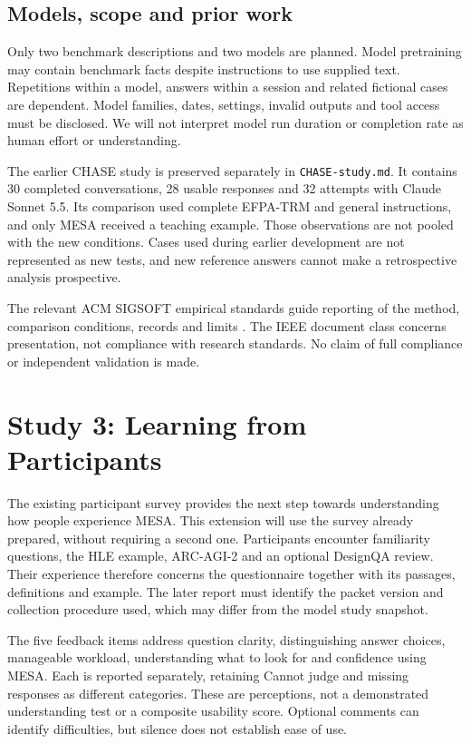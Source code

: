 \documentclass[10pt,conference]{IEEEtran}
\begin{document}
\subsection{Models, scope and prior work}
Only two benchmark descriptions and two models are planned. Model pretraining may contain benchmark facts despite instructions to use supplied text. Repetitions within a model, answers within a session and related fictional cases are dependent. Model families, dates, settings, invalid outputs and tool access must be disclosed. We will not interpret model run duration or completion rate as human effort or understanding.

The earlier CHASE study is preserved separately in \texttt{CHASE-study.md}. It contains 30 completed conversations, 28 usable responses and 32 attempts with Claude Sonnet 5.5. Its comparison used complete EFPA-TRM and general instructions, and only MESA received a teaching example. Those observations are not pooled with the new conditions. Cases used during earlier development are not represented as new tests, and new reference answers cannot make a retrospective analysis prospective.

The relevant ACM SIGSOFT empirical standards guide reporting of the method, comparison conditions, records and limits \cite{sigsoft_empirical_standards}. The IEEE document class concerns presentation, not compliance with research standards. No claim of full compliance or independent validation is made.

\section{Study 3: Learning from Participants}
The existing participant survey provides the next step towards understanding how people experience MESA. This extension will use the survey already prepared, without requiring a second one. Participants encounter familiarity questions, the HLE example, ARC-AGI-2 and an optional DesignQA review. Their experience therefore concerns the questionnaire together with its passages, definitions and example. The later report must identify the packet version and collection procedure used, which may differ from the model study snapshot.

The five feedback items address question clarity, distinguishing answer choices, manageable workload, understanding what to look for and confidence using MESA. Each is reported separately, retaining Cannot judge and missing responses as different categories. These are perceptions, not a demonstrated understanding test or a composite usability score. Optional comments can identify difficulties, but silence does not establish ease of use.
\end{document}
